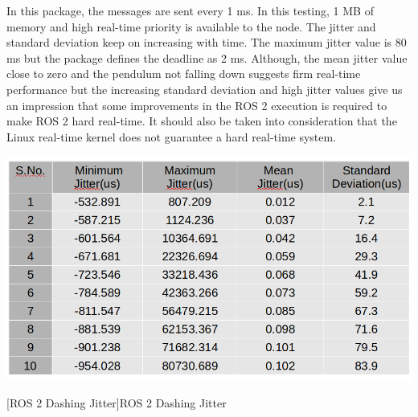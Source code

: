 \documentclass[%
xelatex,
	oneside,		%
	12pt,			%
	parskip=half,	%
	abstracton,
	chapterprefix=true%
    appendixprefix=true]
{scrbook}
\begin{document}
In this package, the messages are sent every 1 ms. In this testing, 1 MB of memory and high real-time priority is available to the node. The jitter and standard deviation keep on increasing with time. The maximum jitter value is 80 ms but the package defines the deadline as 2 ms. Although, the mean jitter value close to zero and the pendulum not falling down suggests firm real-time performance but the increasing standard deviation and high jitter values give us an impression that some improvements in the ROS 2 execution is required to make ROS 2 hard real-time. It should also be taken into consideration that the Linux real-time kernel does not guarantee a hard real-time system.
\begin{center}
\includegraphics[scale=0.4]{fig/ros2dashjitter.png}

[ROS 2 Dashing Jitter]{ROS 2 Dashing Jitter}
\label{tab:ros2dashjit}
\end{center}
\end{document}
